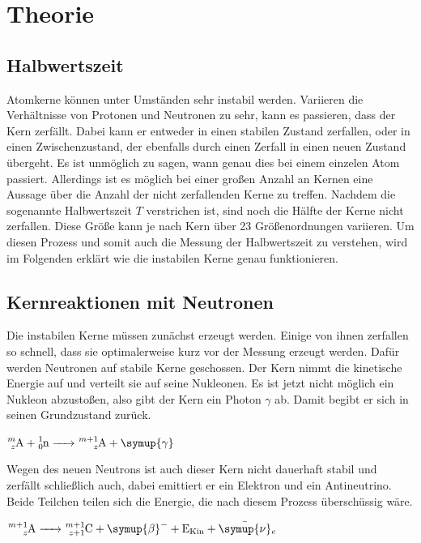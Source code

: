 \section{Theorie}
\label{sec:Theorie}

\subsection{Halbwertszeit}
\label{ssec:t1}

Atomkerne können unter Umständen sehr instabil werden.
Variieren die Verhältnisse von Protonen und Neutronen zu sehr, kann es passieren, dass der Kern zerfällt.
Dabei kann er entweder in einen stabilen Zustand zerfallen, oder in einen Zwischenzustand, der ebenfalls durch einen Zerfall in einen neuen Zustand übergeht.
Es ist unmöglich zu sagen, wann genau dies bei einem einzelen Atom passiert.
Allerdings ist es möglich bei einer großen Anzahl an Kernen eine Aussage über die Anzahl der nicht zerfallenden Kerne zu treffen.
Nachdem die sogenannte Halbwertszeit $T$ verstrichen ist, sind noch die Hälfte der Kerne nicht zerfallen.
Diese Größe kann je nach Kern über 23 Größenordnungen variieren.
Um diesen Prozess und somit auch die Messung der Halbwertszeit zu verstehen, wird im Folgenden erklärt wie die instabilen Kerne genau funktionieren.

\subsection{Kernreaktionen mit Neutronen}
\label{ssec:t2}

Die instabilen Kerne müssen zunächst erzeugt werden.
Einige von ihnen zerfallen so schnell, dass sie optimalerweise kurz vor der Messung erzeugt werden.
Dafür werden Neutronen auf stabile Kerne geschossen.
Der Kern nimmt die kinetische Energie auf und verteilt sie auf seine Nukleonen. 
Es ist jetzt nicht möglich ein Nukleon abzustoßen, also gibt der Kern ein Photon $\gamma$ ab.
Damit begibt er sich in seinen Grundzustand zurück. 

$\ce{^{m}_zA + ^{1}_0n -> ^{m+1}_zA + \symup{\gamma}}$

Wegen des neuen Neutrons ist auch dieser Kern nicht dauerhaft stabil und zerfällt schließlich auch, dabei emittiert er ein Elektron und ein Antineutrino. 
Beide Teilchen teilen sich die Energie, die nach diesem Prozess überschüssig wäre.

$  \ce{  ^{m+1}_zA -> ^{m+1}_{z+1}C + \symup{\beta}- + E_{Kin} + \bar{\symup{\nu}}_e}   $

